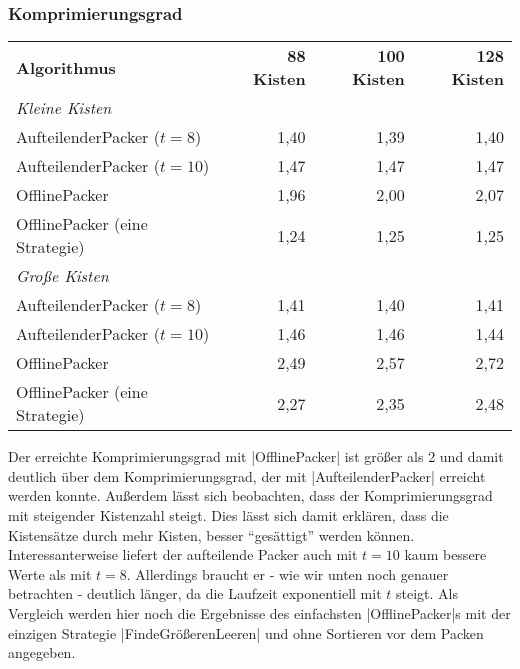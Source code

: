 \subsubsection*{Komprimierungsgrad}
\begin{center}
\begin{tabular}{lrrr}
\vspace*{.42em}
\textbf{Algorithmus} 	& \textbf{88 Kisten} 	& \textbf{100 Kisten} 	& \textbf{128 Kisten} 	\\
\textit{Kleine Kisten} & & & \\
 AufteilenderPacker ($t=8$)  	& 1,40		& 1,39			& 1,40			\\
 AufteilenderPacker ($t=10$)	& 1,47		& 1,47			& 1,47			\\
 OfflinePacker			& 1,96		& 2,00			& 2,07			\\
 OfflinePacker (eine Strategie)	& 1,24		& 1,25			& 1,25			\\
\vspace*{.42em}
\textit{Große Kisten} & & & \\
 AufteilenderPacker ($t=8$)  	& 1,41		& 1,40			& 1,41			\\
 AufteilenderPacker ($t=10$)	& 1,46		& 1,46			& 1,44			\\
 OfflinePacker			& 2,49		& 2,57			& 2,72			\\
 OfflinePacker (eine Strategie)	& 2,27		& 2,35			& 2,48			\\
\end{tabular}
\end{center}
 Der erreichte Komprimierungsgrad mit |OfflinePacker| ist größer als 2 und damit deutlich über dem Komprimierungsgrad, der mit |AufteilenderPacker|
  erreicht werden konnte. Außerdem lässt sich beobachten, dass der Komprimierungsgrad mit steigender Kistenzahl steigt.
 Dies lässt sich damit erklären, dass die Kistensätze durch mehr Kisten, besser ``gesättigt'' werden können. 
 Interessanterweise liefert der aufteilende Packer auch mit $t=10$ kaum bessere Werte als mit $t=8$.
 Allerdings braucht er - wie wir unten noch genauer betrachten - deutlich länger, da die Laufzeit exponentiell mit $t$ steigt.
 Als Vergleich werden hier noch die Ergebnisse des einfachsten |OfflinePacker|s mit der einzigen Strategie |FindeGrößerenLeeren| und ohne Sortieren vor dem Packen angegeben.

